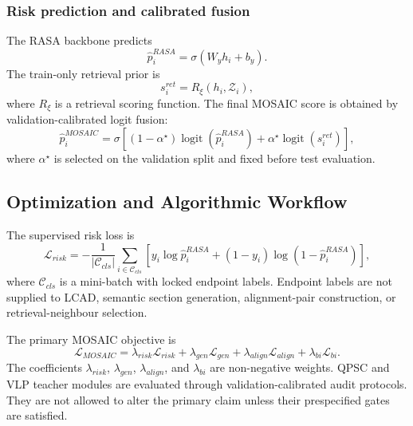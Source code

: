 \subsubsection{Risk prediction and calibrated fusion}
\label{subsubsec:risk_prediction_final_topcs}

The RASA backbone predicts
\begin{equation}
\hat p_i^{RASA}
=
\sigma(W_yh_i+b_y).
\label{eq:mosaic_rasa_probability_final_topcs}
\end{equation}
The train-only retrieval prior is
\begin{equation}
s_i^{ret}=R_{\xi}(h_i,\mathcal{Z}_i),
\label{eq:mosaic_retrieval_prior_final_topcs}
\end{equation}
where $R_{\xi}$ is a retrieval scoring function. The final MOSAIC score is obtained by validation-calibrated logit fusion:
\begin{equation}
\hat p_i^{MOSAIC}
=
\sigma\left[
(1-\alpha^{\star})\operatorname{logit}(\hat p_i^{RASA})
+
\alpha^{\star}\operatorname{logit}(s_i^{ret})
\right],
\label{eq:mosaic_logit_fusion_final_topcs}
\end{equation}
where $\alpha^{\star}$ is selected on the validation split and fixed before test evaluation.

\subsection{Optimization and Algorithmic Workflow}
\label{subsec:optimization_workflow_final_topcs}

The supervised risk loss is
\begin{equation}
\mathcal{L}_{risk}
=
-\frac{1}{|\mathcal{C}_{cls}|}
\sum_{i\in\mathcal{C}_{cls}}
\left[
y_i\log\hat p_i^{RASA}
+
(1-y_i)\log(1-\hat p_i^{RASA})
\right],
\label{eq:mosaic_risk_loss_final_topcs}
\end{equation}
where $\mathcal{C}_{cls}$ is a mini-batch with locked endpoint labels. Endpoint labels are not supplied to LCAD, semantic section generation, alignment-pair construction, or retrieval-neighbour selection.

The primary MOSAIC objective is
\begin{equation}
\mathcal{L}_{MOSAIC}
=
\lambda_{risk}\mathcal{L}_{risk}
+
\lambda_{gen}\mathcal{L}_{gen}
+
\lambda_{align}\mathcal{L}_{align}
+
\lambda_{bi}\mathcal{L}_{bi}.
\label{eq:mosaic_overall_objective_final_topcs}
\end{equation}
The coefficients $\lambda_{risk}$, $\lambda_{gen}$, $\lambda_{align}$, and $\lambda_{bi}$ are non-negative weights. QPSC and VLP teacher modules are evaluated through validation-calibrated audit protocols. They are not allowed to alter the primary claim unless their prespecified gates are satisfied.

